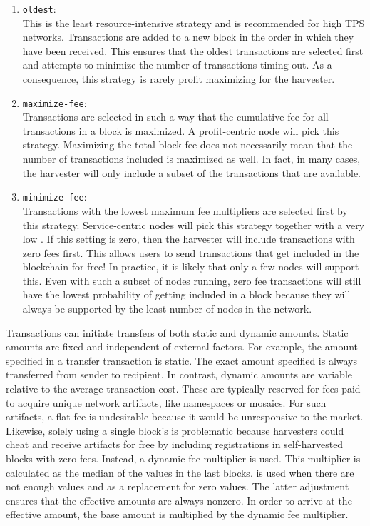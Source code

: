 \begin{enumerate}
\item{\texttt{oldest}: \\
This is the least resource-intensive strategy and is recommended for high TPS networks.
Transactions are added to a new block in the order in which they have been received.
This ensures that the oldest transactions are selected first and attempts to minimize the number of transactions timing out.
As a consequence, this strategy is rarely profit maximizing for the harvester.}
\item{\texttt{maximize-fee}: \\
Transactions are selected in such a way that the cumulative fee for all transactions in a block is maximized.
A profit-centric node will pick this strategy.
Maximizing the total block fee does not necessarily mean that the number of transactions included is maximized as well.
In fact, in many cases, the harvester will only include a subset of the transactions that are available.}
\item{\texttt{minimize-fee}: \\
Transactions with the lowest maximum fee multipliers are selected first by this strategy.
Service-centric nodes will pick this strategy together with a very low .
If this setting is zero, then the harvester will include transactions with zero fees first.
This allows users to send transactions that get included in the blockchain for free!
In practice, it is likely that only a few nodes will support this.
Even with such a subset of nodes running, zero fee transactions will still have the lowest probability of getting included in a block because they will always be supported by the least number of nodes in the network.}
\end{enumerate}

Transactions can initiate transfers of both static and dynamic amounts.
Static amounts are fixed and independent of external factors.
For example, the amount specified in a transfer transaction is static.
The exact amount specified is always transferred from sender to recipient.
In contrast, dynamic amounts are variable relative to the average transaction cost.
These are typically reserved for fees paid to acquire unique network artifacts, like namespaces or mosaics.
For such artifacts, a flat fee is undesirable because it would be unresponsive to the market.
Likewise, solely using a single block's  is problematic because harvesters could cheat and receive artifacts for free by including registrations in self-harvested blocks with zero fees.
Instead, a dynamic fee multiplier is used.
This multiplier is calculated as the median of the  values in the last  blocks.
 is used when there are not enough values and as a replacement for zero values.
The latter adjustment ensures that the effective amounts are always nonzero.
In order to arrive at the effective amount, the base amount is multiplied by the dynamic fee multiplier.

